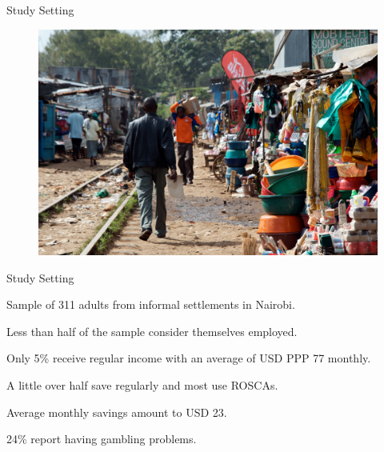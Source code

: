 \documentclass[aspectratio=169]{beamer}
\newenvironment{wideitemize}{\itemize\addtolength{\itemsep}{10pt}}{\enditemize}
\begin{document}
\begin{frame}{Study Setting}

	\begin{figure}[H]
		\centering
		\includegraphics[height=0.8\textheight]{kibera-tracks.jpg}
	\end{figure}


\end{frame}

\begin{frame}{Study Setting}

	Sample of 311 adults from informal settlements in Nairobi.

	\begin{wideitemize}
		\item Less than half of the sample consider themselves employed.
		\item Only 5\% receive regular income with an average of USD PPP 77 monthly.
		\item A little over half save regularly and most use ROSCAs.
		\item Average monthly savings amount to USD 23.
		\item 24\% report having gambling problems.
	\end{wideitemize}



\end{frame}
\end{document}
